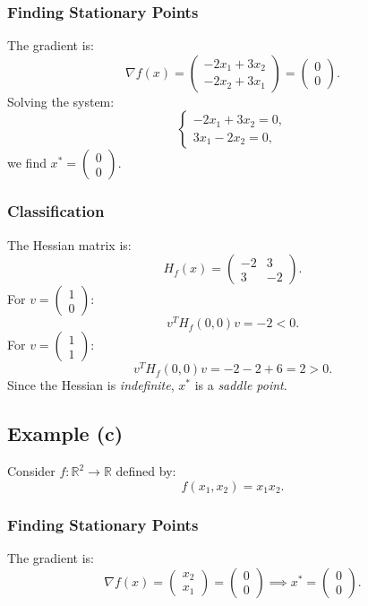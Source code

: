 \documentclass{article}
\begin{document}
\subsubsection*{Finding Stationary Points}
The gradient is:
\[
\nabla f(x) = 
\begin{pmatrix}
-2x_1 + 3x_2 \\
-2x_2 + 3x_1
\end{pmatrix}
=
\begin{pmatrix}
0 \\
0
\end{pmatrix}.
\]
Solving the system:
\[
\begin{cases}
-2x_1 + 3x_2 = 0, \\
3x_1 - 2x_2 = 0,
\end{cases}
\]
we find \( x^* = \begin{pmatrix} 0 \\ 0 \end{pmatrix} \).

\subsubsection*{Classification}
The Hessian matrix is:
\[
H_f(x) = 
\begin{pmatrix}
-2 & 3 \\
3 & -2
\end{pmatrix}.
\]
For \( v = \begin{pmatrix} 1 \\ 0 \end{pmatrix} \):
\[
v^T H_f(0,0) v = -2 < 0.
\]
For \( v = \begin{pmatrix} 1 \\ 1 \end{pmatrix} \):
\[
v^T H_f(0,0) v = -2 - 2 + 6 = 2 > 0.
\]
Since the Hessian is \textit{indefinite}, \( x^* \) is a \textit{saddle point}.

\subsection*{Example (c)}
Consider \( f : \mathbb{R}^2 \rightarrow \mathbb{R} \) defined by:
\[
f(x_1, x_2) = x_1 x_2.
\]

\subsubsection*{Finding Stationary Points}
The gradient is:
\[
\nabla f(x) = 
\begin{pmatrix}
x_2 \\
x_1
\end{pmatrix}
=
\begin{pmatrix}
0 \\
0
\end{pmatrix}
\implies x^* = \begin{pmatrix} 0 \\ 0 \end{pmatrix}.
\]
\end{document}
